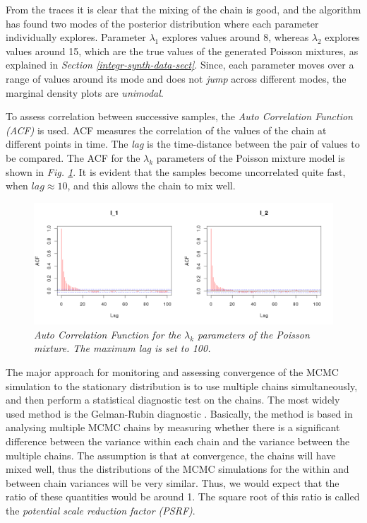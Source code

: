 From the traces it is clear that the mixing of the chain is good, and the algorithm has found two modes of the posterior distribution where each parameter individually explores. Parameter $\lambda_{1}$ explores values around 8, whereas $\lambda_{2}$ explores values around 15, which are the true values of the generated Poisson mixtures, as explained in \emph{Section \ref{integr-synth-data-sect}}. Since, each parameter moves over a range of values around its mode and does not \emph{jump} across different modes, the marginal density plots are \emph{unimodal}.

To assess correlation between successive samples, the \emph{Auto Correlation Function (ACF)} is used. ACF measures the correlation of the values of the chain at different points in time. The \emph{lag} is the time-distance between the pair of values to be compared. The ACF for the $\lambda_{k}$ parameters of the Poisson mixture model is shown in \emph{Fig. \ref{acfL-pic}}. It is evident that the samples become uncorrelated quite fast, when $lag \approx 10$, and this allows the chain to mix well.
\begin{figure}[!ht]
\begin{center}
 \includegraphics[scale = 0.40]{images/acfL.png}
\caption{\emph{Auto Correlation Function for the $\lambda_{k}$ parameters of the Poisson mixture. The maximum lag is set to 100.}}
\label{acfL-pic}
\end{center}
\end{figure}

The major approach for monitoring and assessing convergence of the MCMC simulation to the stationary distribution is to use multiple chains simultaneously, and then perform a statistical diagnostic test on the chains. The most widely used method is the Gelman-Rubin diagnostic \citep{Gelman1992, Brooks1997}. Basically, the method is based in analysing multiple MCMC chains by measuring whether there is a significant difference between the variance within each chain and the variance between the multiple chains. The assumption is that at convergence, the chains will have mixed well, thus the distributions of the MCMC simulations for the within and between chain variances will be very similar. Thus, we would expect that the ratio of these quantities would be around 1. The square root of this ratio is called the \emph{potential scale reduction factor (PSRF)}. 

